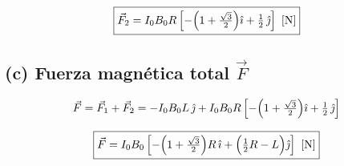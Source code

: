 \documentclass[12pt,letterpaper]{article}
\begin{document}
\[
    \boxed{\vec{F}_2 = I_0 B_0 R\left[-\Bigl(1+\tfrac{\sqrt{3}}{2}\Bigr)\hat{\imath}
        + \tfrac{1}{2}\,\hat{\jmath}\right]\ [\text{N}]}
\]

\bigskip

\subsection*{(c) Fuerza magn\'etica total $\vec{F}$}

\[
    \vec{F} = \vec{F}_1 + \vec{F}_2
            = -I_0 B_0 L\,\hat{\jmath}
              + I_0 B_0 R\left[-\Bigl(1+\tfrac{\sqrt{3}}{2}\Bigr)\hat{\imath}
              + \tfrac{1}{2}\,\hat{\jmath}\right]
\]

\[
    \boxed{\vec{F} = I_0 B_0\left[-\Bigl(1+\tfrac{\sqrt{3}}{2}\Bigr)R\,\hat{\imath}
        + \Bigl(\tfrac{1}{2}R - L\Bigr)\hat{\jmath}\right]\ [\text{N}]}
\]
\end{document}
